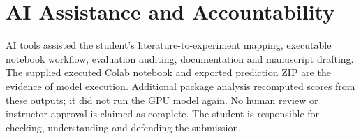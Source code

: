 \documentclass[conference]{IEEEtran}
\begin{document}
\section*{AI Assistance and Accountability}
AI tools assisted the student's literature-to-experiment mapping, executable notebook workflow, evaluation auditing, documentation and manuscript drafting. The supplied executed Colab notebook and exported prediction ZIP are the evidence of model execution. Additional package analysis recomputed scores from these outputs; it did not run the GPU model again. No human review or instructor approval is claimed as complete. The student is responsible for checking, understanding and defending the submission.



\end{document}
